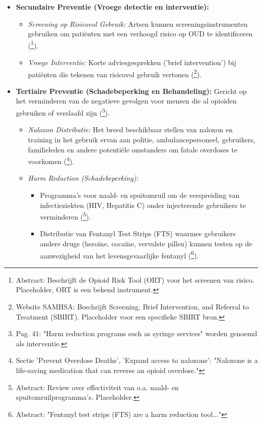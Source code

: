 \documentclass[11pt, a4paper]{report} %
\begin{document}
\begin{itemize}
\begin{itemize}
        \end{itemize}
    \item \textbf{Secundaire Preventie (Vroege detectie en interventie):}
        \begin{itemize}
            \item \textit{Screening op Risicovol Gebruik:} Artsen kunnen screeningsinstrumenten gebruiken om patiënten met een verhoogd risico op OUD te identificeren (\cite{Webster2005OpioidRiskTool}\footnote{Abstract: Beschrijft de Opioid Risk Tool (ORT) voor het screenen van risico. Placeholder, ORT is een bekend instrument.}).
            \item \textit{Vroege Interventie:} Korte adviesgesprekken ('brief intervention') bij patiënten die tekenen van risicovol gebruik vertonen (\cite{SAMHSA_SBIRT_Overview}\footnote{Website SAMHSA: Beschrijft Screening, Brief Intervention, and Referral to Treatment (SBIRT). Placeholder voor een specifieke SBIRT bron.}).
        \end{itemize}
    \item \textbf{Tertiaire Preventie (Schadebeperking en Behandeling):} Gericht op het verminderen van de negatieve gevolgen voor mensen die al opioïden gebruiken of verslaafd zijn (\cite{Compton2021Polysubstance}\footnote{Pag. 41: "Harm reduction programs such as syringe services" worden genoemd als interventie.}).
        \begin{itemize}
            \item \textit{Naloxon Distributie:} Het breed beschikbaar stellen van naloxon en training in het gebruik ervan aan politie, ambulancepersoneel, gebruikers, familieleden en andere potentiële omstanders om fatale overdoses te voorkomen (\cite{CDCPreventingOverdose}\footnote{Sectie 'Prevent Overdose Deaths', 'Expand access to naloxone': "Naloxone is a life-saving medication that can reverse an opioid overdose."}).
            \item \textit{Harm Reduction (Schadebeperking):}
                \begin{itemize}
                    \item Programma's voor naald- en spuitomruil om de verspreiding van infectieziekten (HIV, Hepatitis C) onder injecterende gebruikers te verminderen (\cite{MacArthur2014InterventionsPreventHIVHepC}\footnote{Abstract: Review over effectiviteit van o.a. naald- en spuitomruilprogramma's. Placeholder.}).
                    \item Distributie van Fentanyl Test Strips (FTS) waarmee gebruikers andere drugs (heroïne, cocaïne, vervalste pillen) kunnen testen op de aanwezigheid van het levensgevaarlijke fentanyl (\cite{Peiper2019FentanylTestStrips}\footnote{Abstract: "Fentanyl test strips (FTS) are a harm reduction tool..."}).

\end{itemize}
\end{itemize}
\end{itemize}
\end{document}
